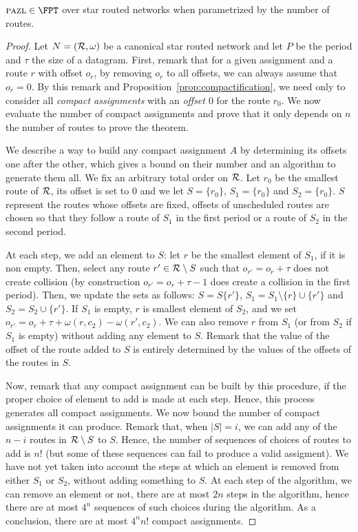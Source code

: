 \begin{theorem}\label{th:FPT}
$\pma \in \FPT$ over star routed networks when parametrized by the number of routes.
\end{theorem}
\begin{proof}
Let $N = ({\cal R},\omega)$ be a canonical star routed network and let $P$ be the period and $\tau$ the size of a datagram. First, remark that for a given assignment and a route $r$ with offset $o_r$, by removing $o_r$ to all offsets, we can always assume that $o_r = 0$. By this remark and Proposition~\ref{prop:compactification}, we need only to consider all \emph{compact assignments} with an \emph{offset $0$} for the route $r_0$. We now evaluate the number of compact assignments and prove that it only depends on $n$ the number of routes to prove the theorem.

 We describe a way to build any compact assignment $A$ by determining its offsets one after the other, which gives a bound on their number and an algorithm to generate them all. We fix an arbitrary total order on ${\cal R}$. Let $r_0$ be the smallest route of $\cal{R}$, its offset is set to $0$ and we let $S = \{r_0\}$,
 $S_1 = \{r_0\}$ and $S_2 = \{r_0\}$. $S$ represent the routes whose offsets are fixed, 
 offsets of unscheduled routes are chosen so that they follow a route of $S_1$ in the first period or a route of $S_2$ in the second period.

 At each step, we add an element to $S$: let $r$ be the smallest element of $S_1$, if it is non empty. Then, select any route $r' \in {\cal R} \setminus S$ 
 such that $o_{r'} = o_{r} + \tau$ does not create collision (by construction $o_{r'} = o_{r} + \tau - 1$ does create a collision in the first period). Then, we update the sets as follows:
 $S = S \{r'\}$, $S_1 = S_1 \setminus \{r\} \cup \{r'\}$ and $S_2 = S_2 \cup \{r'\}$. If 
 $S_1$ is empty, $r$ is smallest element of $S_2$, and we set $o_{r'} = o_{r} + \tau + \omega(r,c_2) - \omega(r',c_2)$.
 We can also remove $r$ from $S_1$ (or from $S_2$ if $S_1$ is empty) without adding any element to $S$. Remark that the value of the offset of the route added to $S$ is entirely determined by the values of the offsets of the routes in $S$.

 Now, remark that any compact assignment can be built by this procedure, if the proper choice of element to add is made at each step. Hence, this process generates all compact assignments. We now bound the number of compact assignments it can produce. Remark that, when $|S| = i$, we can add any of the $n-i$ routes in ${\cal R} \setminus S$ to $S$. Hence, the number of sequences of choices of routes to add is $n!$ (but some of these sequences can fail to produce a valid assigment). We have not yet taken into account the steps at which an element is removed from either $S_1$ or $S_2$, without adding something to $S$. At each step of the algorithm, we can remove an element or not, there are at most $2n$ steps in the algorithm, hence there are at most $4^n$ sequences of such choices during the algorithm. As a conclusion, there are at most $4^nn!$ compact assignments.


\end{proof}
